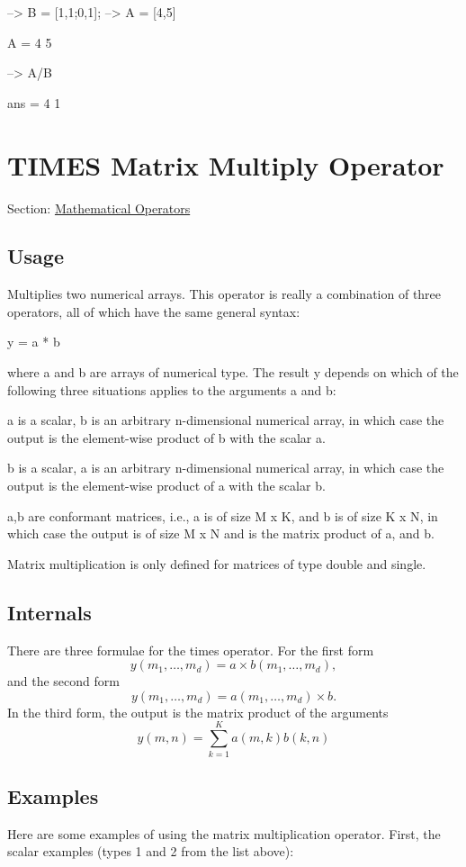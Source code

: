 \begin{DoxyVerbInclude}
--> B = [1,1;0,1];
--> A = [4,5]

A = 
 4 5 

--> A/B

ans = 
 4 1 
\end{DoxyVerbInclude}
 \hypertarget{operators_times}{}\section{T\-I\-M\-E\-S Matrix Multiply Operator}\label{operators_times}
Section\-: \hyperlink{sec_operators}{Mathematical Operators} \hypertarget{vtkwidgets_vtkxyplotwidget_Usage}{}\subsection{Usage}\label{vtkwidgets_vtkxyplotwidget_Usage}
Multiplies two numerical arrays. This operator is really a combination of three operators, all of which have the same general syntax\-: \begin{DoxyVerb}  y = a * b
\end{DoxyVerb}
 where {\ttfamily a} and {\ttfamily b} are arrays of numerical type. The result {\ttfamily y} depends on which of the following three situations applies to the arguments {\ttfamily a} and {\ttfamily b}\-: 
\begin{DoxyEnumerate}
\item {\ttfamily a} is a scalar, {\ttfamily b} is an arbitrary {\ttfamily n}-\/dimensional numerical array, in which case the output is the element-\/wise product of {\ttfamily b} with the scalar {\ttfamily a}.  
\item {\ttfamily b} is a scalar, {\ttfamily a} is an arbitrary {\ttfamily n}-\/dimensional numerical array, in which case the output is the element-\/wise product of {\ttfamily a} with the scalar {\ttfamily b}.  
\item {\ttfamily a,b} are conformant matrices, i.\-e., {\ttfamily a} is of size {\ttfamily M x K}, and {\ttfamily b} is of size {\ttfamily K x N}, in which case the output is of size {\ttfamily M x N} and is the matrix product of {\ttfamily a}, and {\ttfamily b}.  
\end{DoxyEnumerate}Matrix multiplication is only defined for matrices of type {\ttfamily double} and {\ttfamily single}. \hypertarget{transforms_svd_Function}{}\subsection{Internals}\label{transforms_svd_Function}
There are three formulae for the times operator. For the first form \[ y(m_1,\ldots,m_d) = a \times b(m_1,\ldots,m_d), \] and the second form \[ y(m_1,\ldots,m_d) = a(m_1,\ldots,m_d) \times b. \] In the third form, the output is the matrix product of the arguments \[ y(m,n) = \sum_{k=1}^{K} a(m,k) b(k,n) \] \hypertarget{variables_matrix_Examples}{}\subsection{Examples}\label{variables_matrix_Examples}
Here are some examples of using the matrix multiplication operator. First, the scalar examples (types 1 and 2 from the list above)\-:


